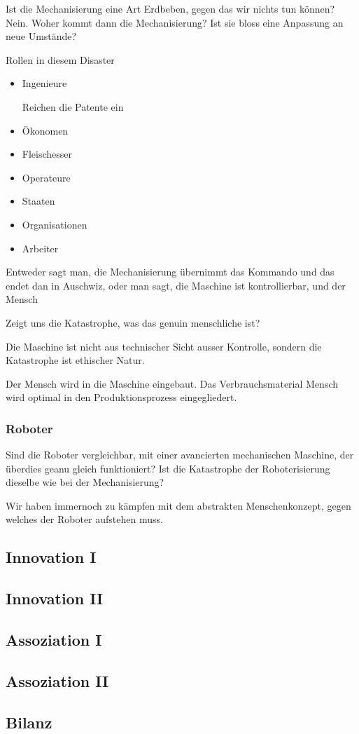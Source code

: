 \documentclass[a4paper,ngerman,11pt]{scrartcl}
\begin{document}
Ist die Mechanisierung eine Art Erdbeben, gegen das wir nichts tun können?
Nein. Woher kommt dann die Mechanisierung? Ist sie bloss eine Anpassung an
neue Umstände?

Rollen in diesem Disaster

\begin{itemize}
\item Ingenieure

Reichen die Patente ein

\item Ökonomen

\item Fleischesser

\item Operateure

\item Staaten

\item Organisationen

\item Arbeiter
\end{itemize}


Entweder sagt man, die Mechanisierung übernimmt das Kommando und das endet
dan in Auschwiz, oder man sagt, die Maschine ist kontrollierbar, und der
Mensch 

Zeigt uns die Katastrophe, was das genuin menschliche ist? 

Die Maschine ist nicht aus technischer Sicht ausser Kontrolle, sondern die
Katastrophe ist ethischer Natur.

Der Mensch wird in die Maschine eingebaut. Das Verbrauchsmaterial Mensch wird
optimal in den Produktionsprozess eingegliedert.


\subsubsection{Roboter}
\label{sec-2-8-1}

Sind die Roboter vergleichbar, mit einer avancierten mechanischen Maschine,
der überdies geanu gleich funktioniert? Ist die Katastrophe der
Roboterisierung dieselbe wie bei der Mechanisierung?

Wir haben immernoch zu kämpfen mit dem abstrakten Menschenkonzept, gegen
welches der Roboter aufstehen muss.

\subsection{Innovation I}
\label{sec-2-9}

\subsection{Innovation II}
\label{sec-2-10}

\subsection{Assoziation I}
\label{sec-2-11}

\subsection{Assoziation II}
\label{sec-2-12}

\subsection{Bilanz}
\label{sec-2-13}
\end{document}
